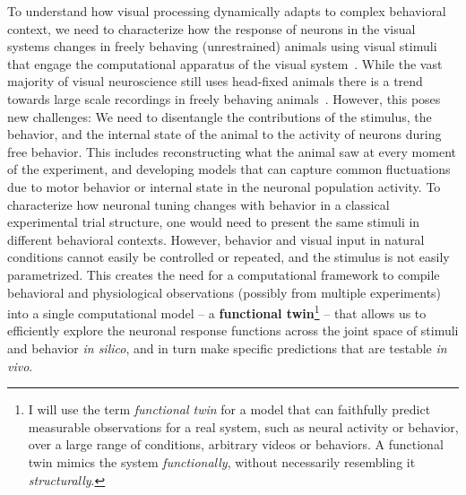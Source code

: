 \documentclass[COG,11pt]{ercgrant}
\begin{document}
To understand how visual processing dynamically adapts to complex behavioral context, we need to characterize how the response of neurons in the visual systems changes in freely behaving (unrestrained) animals using visual stimuli that engage the computational apparatus of the visual system~\parencite{Huk2018-ez, Datta2019-qj}. 
While the vast majority of visual neuroscience still uses head-fixed animals there is a trend towards large scale recordings in freely behaving animals~\parencite[\eg][]{Parker2022-ac}.
However, this poses new challenges:
 We need to disentangle the contributions of the stimulus, the behavior, and the internal state of the animal to the activity of neurons during free behavior. 
This includes reconstructing what the animal saw at every moment of the experiment, and developing models that can capture common fluctuations due to motor behavior or internal state in the neuronal population activity.
 To characterize how neuronal tuning changes with behavior in a classical experimental trial structure, one would need to present the same stimuli in different behavioral contexts. 
However, behavior and visual input in natural conditions cannot easily be controlled or repeated, and the stimulus is not easily parametrized.
This creates the need for a computational framework to compile behavioral and physiological observations (possibly from multiple experiments) into a single computational model -- a \textbf{functional twin}\footnote{I will use the term \textit{functional twin} for a model that can faithfully predict measurable observations for a real system, such as neural activity or behavior, over a large range of conditions, \eg arbitrary videos or behaviors. A functional twin mimics the system \textit{functionally}, without necessarily resembling it \textit{structurally}. } -- that allows us to efficiently explore the neuronal response functions across the joint space of stimuli and behavior \textit{in silico}, and in turn make specific predictions that are testable \textit{in vivo}.
\end{document}
